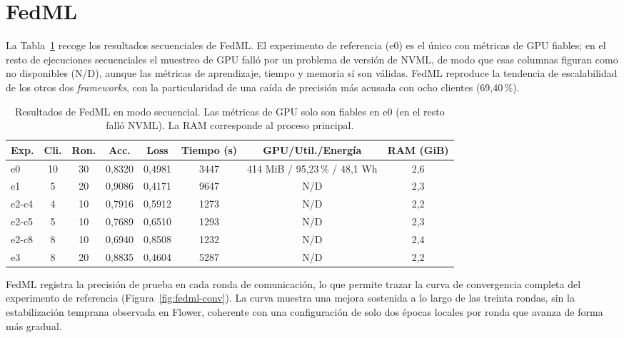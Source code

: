 \section{FedML}\label{sec:resultados-fedml}

La Tabla~\ref{tab:fedml-seq} recoge los resultados secuenciales de FedML. El experimento de
referencia (e0) es el único con métricas de GPU fiables; en el resto de ejecuciones secuenciales
el muestreo de GPU falló por un problema de versión de NVML, de modo que esas columnas figuran
como no disponibles (N/D), aunque las métricas de aprendizaje, tiempo y memoria sí son válidas.
FedML reproduce la tendencia de escalabilidad de los otros dos \textit{frameworks}, con la
particularidad de una caída de precisión más acusada con ocho clientes (69{,}40\,\%).

\begin{table}[htbp]
  \centering
  \footnotesize
  \setlength{\tabcolsep}{4pt}
  \caption{Resultados de FedML en modo secuencial. Las métricas de GPU solo son fiables en e0
  (en el resto falló NVML). La RAM corresponde al proceso principal.}
  \label{tab:fedml-seq}
  \begin{tabular}{lccccccc}
    \toprule
    Exp. & Cli. & Ron. & Acc. & Loss & Tiempo (s) & GPU/Util./Energía & RAM (GiB) \\
    \midrule
    e0    & 10 & 30 & 0,8320 & 0,4981 & 3447 & 414 MiB / 95,23\,\% / 48,1 Wh & 2,6 \\
    e1    & 5  & 20 & 0,9086 & 0,4171 & 9647 & N/D & 2,3 \\
    e2-c4 & 4  & 10 & 0,7916 & 0,5912 & 1273 & N/D & 2,2 \\
    e2-c5 & 5  & 10 & 0,7689 & 0,6510 & 1293 & N/D & 2,3 \\
    e2-c8 & 8  & 10 & 0,6940 & 0,8508 & 1232 & N/D & 2,4 \\
    e3    & 8  & 20 & 0,8835 & 0,4604 & 5287 & N/D & 2,2 \\
    \bottomrule
  \end{tabular}
\end{table}

FedML registra la precisión de prueba en cada ronda de comunicación, lo que permite trazar la
curva de convergencia completa del experimento de referencia (Figura~\ref{fig:fedml-conv}). La
curva muestra una mejora sostenida a lo largo de las treinta rondas, sin la estabilización
temprana observada en Flower, coherente con una configuración de solo dos épocas locales por
ronda que avanza de forma más gradual.

